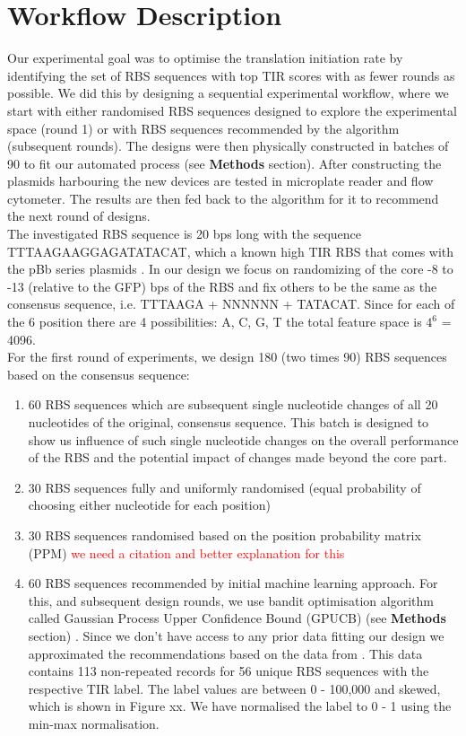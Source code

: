 \documentclass{article}
\begin{document}


\section{Workflow Description}

Our experimental goal was to optimise the translation initiation rate by identifying the set of RBS sequences with top TIR scores with as fewer rounds as possible. We did this by designing a sequential experimental workflow, where we start with either randomised RBS sequences designed to explore the experimental space (round 1) or with RBS sequences recommended by the algorithm (subsequent rounds). The designs were then physically constructed in batches of 90 to fit our automated process (see \textbf{Methods} section). After constructing the plasmids harbouring the new devices are tested in microplate reader and flow cytometer. The results are then fed back to the algorithm for it to recommend the next round of designs.\\
The investigated RBS sequence is 20 bps long with the sequence TTTAAGAAGGAGATATACAT, which a known high TIR RBS that comes with the pBb series plasmids \cite{Lee2011}. In our design we focus on randomizing of the core -8 to -13 (relative to the GFP) bps of the RBS and fix others to be the same as the consensus sequence, i.e. TTTAAGA + NNNNNN + TATACAT. Since for each of the 6 position there are 4 possibilities: A, C, G, T the total feature space is $4^6$ = 4096.\\
For the first round of experiments, we design 180 (two times 90) RBS sequences based on the consensus sequence: 

\begin{enumerate}
    \item 60 RBS sequences which are subsequent single nucleotide changes of all 20 nucleotides of the original, consensus sequence. This batch is designed to show us influence of such single nucleotide changes on the overall performance of the RBS and the potential impact of changes made beyond the core part.
    \item 30 RBS sequences fully and uniformly randomised (equal probability of choosing either nucleotide for each position) 
    \item 30 RBS sequences randomised based on the position probability matrix (PPM) \textcolor{red}{we need a citation and better explanation for this}  
    \item 60 RBS sequences recommended by initial machine learning approach. For this, and subsequent design rounds, we use bandit optimisation algorithm called Gaussian Process Upper Confidence Bound (GPUCB) (see \textbf{Methods} section) \cite{srinivas2012information}. Since we don't have access to any prior data fitting our design we approximated the recommendations based on the data from \textcite{jervis2018machine}. This data contains 113 non-repeated records for 56 unique RBS sequences with the respective TIR label. The label values are between 0 - 100,000 and skewed, which is shown in Figure xx. We have normalised the label to 0 - 1 using the min-max normalisation.   
\end{enumerate}{}
\end{document}

